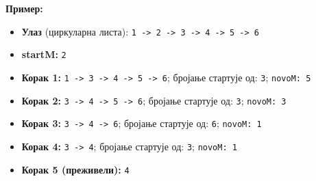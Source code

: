 \textbf{Пример:}
\begin{itemize}
	\item \textbf{Улаз} (циркуларна листа): \texttt{1 -> 2 -> 3 -> 4 -> 5 -> 6}
	\item \textbf{startM:} \texttt{2}
	\item \textbf{Корак 1:} \texttt{1 -> 3 -> 4 -> 5 -> 6}; бројање стартује од: \texttt{3}; \texttt{novoM: 5}
	\item \textbf{Корак 2:} \texttt{3 -> 4 -> 5 -> 6}; бројање стартује од: \texttt{3}; \texttt{novoM: 3}
	\item \textbf{Корак 3:} \texttt{3 -> 4 -> 6}; бројање стартује од: \texttt{6}; \texttt{novoM: 1}
	\item \textbf{Корак 4:} \texttt{3 -> 4}; бројање стартује од: \texttt{3}; \texttt{novoM: 1}
	\item \textbf{Корак 5 (преживели):} \texttt{4}
\end{itemize}

